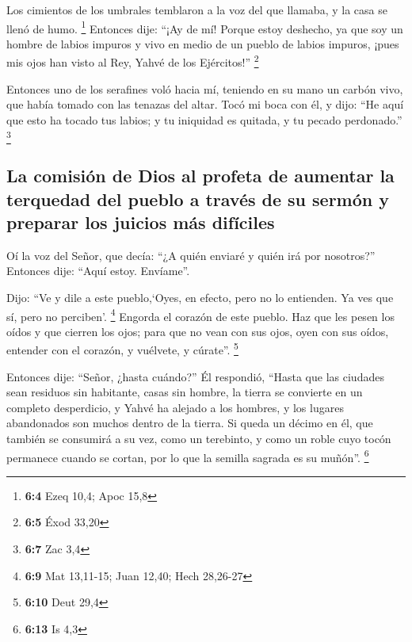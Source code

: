  Los cimientos de los umbrales temblaron a la voz del que
llamaba, y la casa se llenó de humo. \footnote{\textbf{6:4} Ezeq 10,4;
  Apoc 15,8}  Entonces dije: ``¡Ay de mí! Porque estoy
deshecho, ya que soy un hombre de labios impuros y vivo en medio de un
pueblo de labios impuros, ¡pues mis ojos han visto al Rey, Yahvé de los
Ejércitos!'' \footnote{\textbf{6:5} Éxod 33,20}

 Entonces uno de los serafines voló hacia mí, teniendo en
su mano un carbón vivo, que había tomado con las tenazas del altar.
 Tocó mi boca con él, y dijo: ``He aquí que esto ha tocado
tus labios; y tu iniquidad es quitada, y tu pecado perdonado.''
\footnote{\textbf{6:7} Zac 3,4}

\hypertarget{la-comisiuxf3n-de-dios-al-profeta-de-aumentar-la-terquedad-del-pueblo-a-travuxe9s-de-su-sermuxf3n-y-preparar-los-juicios-muxe1s-difuxedciles}{%
\subsection{La comisión de Dios al profeta de aumentar la terquedad del
pueblo a través de su sermón y preparar los juicios más
difíciles}\label{la-comisiuxf3n-de-dios-al-profeta-de-aumentar-la-terquedad-del-pueblo-a-travuxe9s-de-su-sermuxf3n-y-preparar-los-juicios-muxe1s-difuxedciles}}

 Oí la voz del Señor, que decía: ``¿A quién enviaré y
quién irá por nosotros?'' Entonces dije: ``Aquí estoy. Envíame''.

 Dijo: ``Ve y dile a este pueblo,`Oyes, en efecto, pero no
lo entienden. Ya ves que sí, pero no perciben'. \footnote{\textbf{6:9}
  Mat 13,11-15; Juan 12,40; Hech 28,26-27}  Engorda el
corazón de este pueblo. Haz que les pesen los oídos y que cierren los
ojos; para que no vean con sus ojos, oyen con sus oídos, entender con el
corazón, y vuélvete, y cúrate''. \footnote{\textbf{6:10} Deut 29,4}

 Entonces dije: ``Señor, ¿hasta cuándo?'' Él respondió,
``Hasta que las ciudades sean residuos sin habitante, casas sin hombre,
la tierra se convierte en un completo desperdicio,  y
Yahvé ha alejado a los hombres, y los lugares abandonados son muchos
dentro de la tierra.  Si queda un décimo en él, que
también se consumirá a su vez, como un terebinto, y como un roble cuyo
tocón permanece cuando se cortan, por lo que la semilla sagrada es su
muñón''. \footnote{\textbf{6:13} Is 4,3}

